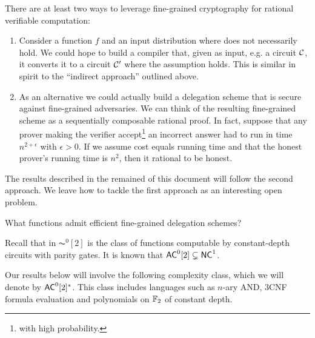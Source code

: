 There are  at least two ways to leverage fine-grained cryptography for rational verifiable computation:
\begin{enumerate}
	\item Consider a function $f$ and an input distribution where \NoFLAVA does not necessarily hold. We could hope to build a compiler that, given as input, e.g. a circuit $\cal{C}$, it converts it to a circuit $\cal{C}'$ where the assumption holds.
	This is similar in spirit to the ``indirect approach'' outlined above. %
	\item As an alternative we could actually build a delegation scheme that is secure against fine-grained adversaries. We can think of the resulting fine-grained scheme as a sequentially composable rational proof. In fact, suppose that any prover making the verifier accept\footnote{with high probability.} an incorrect answer had to run in time $n^{2+\epsilon}$ with $\epsilon > 0$. If we assume cost equals running time and that the honest prover's running time is $n^2$, then it rational to be honest. 
\end{enumerate}

The results described in the remained of this document will follow the second approach.
We leave how to tackle the first approach as an interesting open problem.

\begin{question}
	What functions admit efficient fine-grained delegation schemes?
\end{question}



Recall that in $\AC^0[2]$ is the class of functions computable by constant-depth circuits with
parity gates. It is known that ${\mathsf{AC}}^0[2] \subsetneq {\ensuremath{\mathsf{NC}}}^1$.

Our results below will involve the following complexity class, which we will denote by ${\mathsf{AC}}^0[2]^*$. This class includes languages such as $n$-ary AND, 3CNF formula evaluation and polynomials on $\mathbb{F}_2$ of constant depth. 

